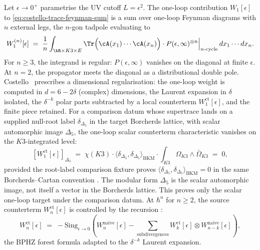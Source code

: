 Let $\epsilon\to 0^+$ parametrise the UV cutoff $L = \epsilon^2$. The
one-loop contribution $W_1[\epsilon]$ to
\eqref{eq:costello-trace-feynman-sum} is a sum over one-loop Feynman
diagrams with $n$ external legs, the $n$-gon tadpole evaluating to
\begin{equation}\label{eq:costello-trace-one-loop}
 W_1^{(n)}[\epsilon]
 \;=\;
 \frac{1}{n}\int_{\bR\times K3\times E}
 \Tr\Bigl(\cA(x_1)\cdots\cA(x_n)\Bigr)\cdot
 P(\epsilon,\infty)^{\otimes n}
 \Big|_{\text{$n$-cycle}}
 \,dx_1\cdots dx_n.
\end{equation}
For $n\geq 3$, the integrand is regular: $P(\epsilon,\infty)$
vanishes on the diagonal at finite $\epsilon$. At $n = 2$, the
propagator meets the diagonal as a distributional double pole.
Costello~\cite[Theorem 3.4.1]{Cos11} prescribes a dimensional
regularisation: the one-loop weight is computed in $d = 6 - 2\delta$
(complex) dimensions, the Laurent expansion in $\delta$ isolated, the
$\delta^{-k}$ polar parts subtracted by a local counterterm
$W_1^{\mathrm{ct}}[\epsilon]$, and the finite piece retained.
For a comparison datum whose supertrace lands on a supplied null-root
label \(\delta_{\Delta_5}\) in the target Borcherds lattice, with scalar
automorphic image \(\Delta_5\), the one-loop scalar counterterm
characteristic vanishes on the \(K3\)-integrated level:
\begin{equation}\label{eq:costello-trace-counterterm-zero}
 [W_1^{\mathrm{ct}}[\epsilon]]_{\Delta_5}
 \;=\;
 \chi(K3)\cdot\langle\delta_{\Delta_5},\delta_{\Delta_5}\rangle_{\mathrm{BKM}}
 \cdot\int_{K3}\Omega_{K3}\wedge\bar\Omega_{K3} \;=\; 0,
\end{equation}
provided the root-label comparison fixture proves
\(\langle\delta_{\Delta_5},\delta_{\Delta_5}\rangle_{\mathrm{BKM}}=0\)
in the same Borcherds--Cartan convention
\cite[\S 5]{Borcherds1998}. The modular form \(\Delta_5\) is the scalar
automorphic image, not itself a vector in the Borcherds lattice. This
proves only the scalar one-loop
target under the comparison datum. At $\hbar^n$ for $n\geq 2$, the
source counterterm
$W_n^{\mathrm{ct}}[\epsilon]$ is controlled
by the recursion \cite[Theorem 5.5.1]{Cos11}:
\begin{equation}\label{eq:costello-trace-counterterm-recursion}
 W_n^{\mathrm{ct}}[\epsilon]
 \;=\;
 -\mathrm{Sing}_{\epsilon\to 0}\!\left(
 W_n^{\mathrm{naive}}[\epsilon]
 - \sum_{\text{subdivergences}}
 W_k^{\mathrm{ct}}[\epsilon]\otimes W_{n-k}^{\mathrm{naive}}[\epsilon]
 \right),
\end{equation}
the BPHZ forest formula adapted to the $\delta^{-k}$ Laurent expansion.

